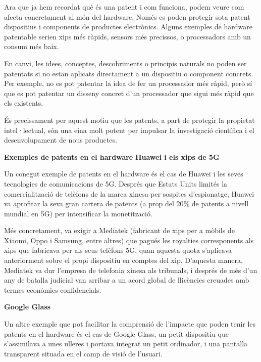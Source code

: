 \documentclass[catalan, a4paper]{article}
\begin{document}
Ara que ja hem recordat què és una patent i com funciona, podem veure com afecta concretament al món del hardware.
Només es poden protegir sota patent dispositius i components de productes electrònics. Alguns exemples de hardware
patentable serien xips més ràpids, sensors més precissos, o processadors amb un consum més baix.

\vspace{1em}

En canvi, les idees, conceptes, descobriments o principis naturals no poden ser patentats si no estan aplicats
directament a un dispositiu o component concrets. Per exemple, no es pot patentar la idea de fer un processador més ràpid, 
però sí que es pot patentar un disseny concret d'un processador que sigui més ràpid que els existents.

\vspace{1em}

És precissament per aquest motiu que les patents, a part de protegir la propietat intel·lectual, són una eina
molt potent per impulsar la investigació científica i el desenvolupament de nous productes.

\vspace{1em}

\textbf{Exemples de patents en el hardware}
\textbf{Huawei i els xips de 5G}

Un conegut exemple de patents en el hardware és el cas de Huawei i les seves tecnologies de comunicacions de 5G.
Després que Estats Units limités la comercialització de telèfons de la marca xinesa per sospites d'espionatge, 
Huawei va aprofitar la seva gran cartera de patents (a prop del 20\% de patents a nivell mundial en 5G) per
intensificar la monetització.

\vspace{1em}

Més concretament, va exigir a Mediatek (fabricant de xips per a mòbils de Xiaomi, Oppo i Samsung, entre altres)
que pagués les royalties corresponents als xips que fabricava per als seus telèfons 5G, quan aquesta quota s'aplicava
anteriorment sobre el propi dispositiu en comptes del xip. D'aquesta manera, Mediatek va dur l'empresa de telefonia
xinesa als tribunals, i després de més d'un any de batalla judicial van arribar a un acord global de llicències
creuades amb termes econòmics confidencials.

\vspace{1em}

\textbf{Google Glass}

Un altre exemple que pot facilitar la comprensió de l'impacte que poden tenir les patents en el hardware
és el cas de Google Glass, un petit dispositiu que s'assimilava a unes ulleres i portava integrat un petit ordinador,
i una pantalla transparent situada en el camp de visió de l'usuari. 
\end{document}
